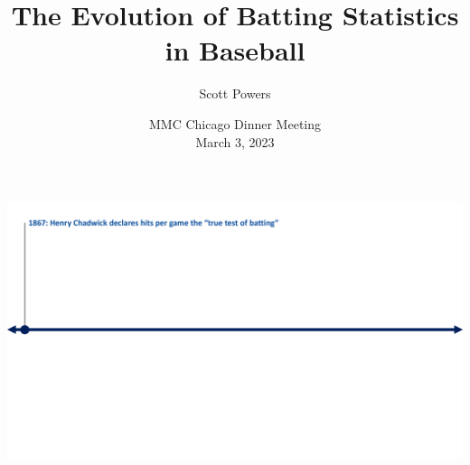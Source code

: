 \documentclass[handout]{beamer}
\title{The Evolution of Batting Statistics in Baseball}
\author{Scott Powers}
\date{MMC Chicago Dinner Meeting \\ March 3, 2023}
\begin{document}
\begin{frame}
  \maketitle
\end{frame}

\begin{frame}
  \includegraphics[width = \textwidth]{figures/timeline_1867.pdf}
\end{frame}
\end{document}
